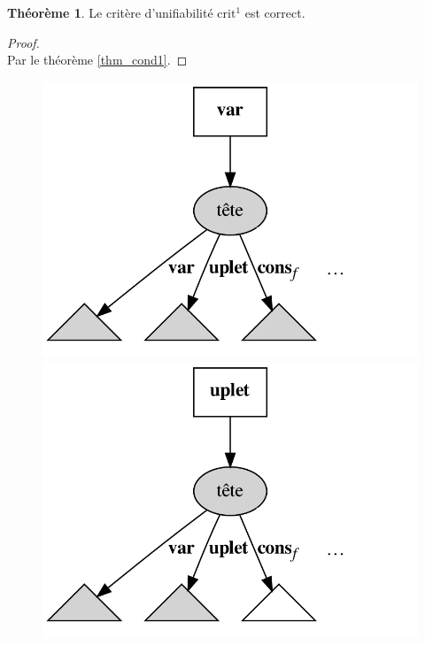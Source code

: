 \documentclass[a4paper]{report}
\newenvironment{preuve} 
  {\begin{proof}~\\} 
  {\end{proof}}
\theoremstyle{definition}
\newtheorem{theoreme}{Théorème}
\begin{document}
\begin{theoreme} \label{thm_crit1}
  Le critère d'unifiabilité $\mathrm{crit}^1$ est correct.
\end{theoreme}

\begin{preuve}
  Par le théorème \ref{thm_cond1}.
\end{preuve}

\begin{figure}[h]
  \begin{center}
    \includegraphics[scale=0.13]{graphs/crit1_1}
    \includegraphics[scale=0.13]{graphs/crit1_2}

\end{center}
\end{figure}
\end{document}
